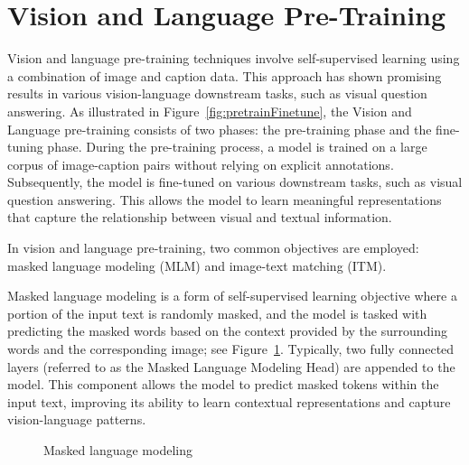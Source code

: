 \section{Vision and Language Pre-Training}
\label{vlp}
Vision and language pre-training techniques \cite{Dou_2022_CVPR, li2020oscar, li2022blip, li2021align, tan2019lxmert, lu2019vilbert} involve self-supervised learning using a combination of image and caption data. This approach has shown promising results in various vision-language downstream tasks, such as visual question answering. As illustrated in Figure~\ref{fig:pretrainFinetune}, the Vision and Language pre-training consists of two phases: the pre-training phase and the fine-tuning phase. During the pre-training process, a model is trained on a large corpus of image-caption pairs without relying on explicit annotations. Subsequently, the model is fine-tuned on various downstream tasks, such as visual question answering. This allows the model to learn meaningful representations that capture the relationship between visual and textual information.

In vision and language pre-training, two common objectives are employed: masked language modeling (MLM) and image-text matching (ITM).

Masked language modeling is a form of self-supervised learning objective where a portion of the input text is randomly masked, and the model is tasked with predicting the masked words based on the context provided by the surrounding words and the corresponding image; see Figure~\ref{fig:mlm}. Typically, two fully connected layers (referred to as the Masked Language Modeling Head) are appended to the model. This component allows the model to predict masked tokens within the input text, improving its ability to learn contextual representations and capture vision-language patterns.

\begin{figure}
\centering
{}
\caption{Masked language modeling \cite{Dou_2022_CVPR}}
\label{fig:mlm}
\end{figure}

